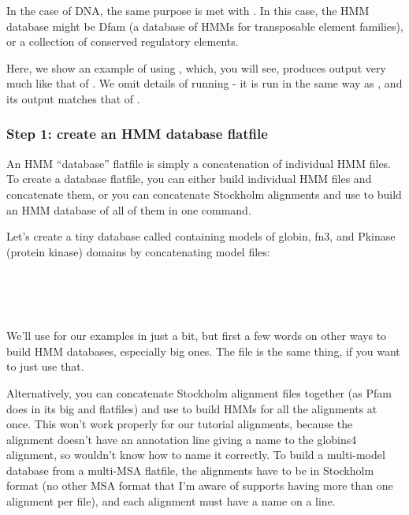 In the case of DNA, the same purpose is met with . In this case,
the HMM database might be Dfam (a database of HMMs for transposable element
families), or a collection of conserved regulatory elements.

Here, we show an example of using , which, you will see, produces
output very much like that of . We omit details of running 
 - it is run in the same way as , and its output
matches that of .

\subsubsection{Step 1: create an HMM database flatfile}

An HMM ``database'' flatfile is simply a concatenation of individual
HMM files. To create a database flatfile, you can either build
individual HMM files and concatenate them, or you can concatenate
Stockholm alignments and use  to build an HMM database
of all of them in one command. 

Let's create a tiny database called  containing models
of globin, fn3, and Pkinase (protein kinase) domains by concatenating
model files:

\\
\\
\\

We'll use  for our examples in just a bit, but first a
few words on other ways to build HMM databases, especially big ones.
The file  is the same thing, if you want to
just use that.

Alternatively, you can concatenate Stockholm alignment files together
(as Pfam does in its big  and 
flatfiles) and use  to build HMMs for all the
alignments at once. This won't work properly for our tutorial
alignments, because the  alignment doesn't have an
 annotation line giving a name to the globins4
alignment, so  wouldn't know how to name it
correctly. To build a multi-model database from a multi-MSA flatfile,
the alignments have to be in Stockholm format (no other MSA format
that I'm aware of supports having more than one alignment per file),
and each alignment must have a name on a  line.

